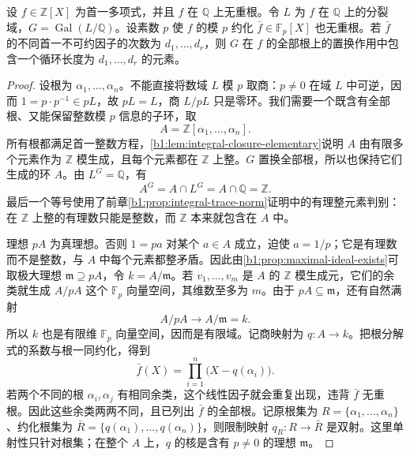 \begin{lemma}\label{b1:lem:reduction-cycle-type}
	设 \(f\in\mathbb Z[X]\) 为首一多项式，并且 \(f\) 在 \(\mathbb Q\) 上无重根。令 \(L\) 为 \(f\) 在 \(\mathbb Q\) 上的分裂域，\(G=\operatorname{Gal}(L/\mathbb Q)\)。设素数 \(p\) 使 \(f\) 的模 \(p\) 约化 \(\bar f\in\mathbb F_p[X]\) 也无重根。若 \(\bar f\) 的不同首一不可约因子的次数为 \(d_1,\ldots,d_r\)，则 \(G\) 在 \(f\) 的全部根上的置换作用中包含一个循环长度为 \(d_1,\ldots,d_r\) 的元素。
\end{lemma}
\begin{proof}
	设根为 \(\alpha_1,\ldots,\alpha_n\)。不能直接将数域 \(L\) 模 \(p\) 取商：\(p\ne0\) 在域 \(L\) 中可逆，因而 \(1=p\cdot p^{-1}\in pL\)，故 \(pL=L\)，商 \(L/pL\) 只是零环。我们需要一个既含有全部根、又能保留整数模 \(p\) 信息的子环，取
	\[
		A=\mathbb Z[\alpha_1,\ldots,\alpha_n].
	\]
	所有根都满足首一整数方程，\cref{b1:lem:integral-closure-elementary}说明 \(A\) 由有限多个元素作为 \(\mathbb Z\) 模生成，且每个元素都在 \(\mathbb Z\) 上整。\(G\) 置换全部根，所以也保持它们生成的环 \(A\)。由 \(L^G=\mathbb Q\)，有
	\[
		A^G=A\cap L^G=A\cap\mathbb Q=\mathbb Z.
	\]
	最后一个等号使用了前章\cref{b1:prop:integral-trace-norm}证明中的有理整元素判别：在 \(\mathbb Z\) 上整的有理数只能是整数，而 \(\mathbb Z\) 本来就包含在 \(A\) 中。

	理想 \(pA\) 为真理想。否则 \(1=pa\) 对某个 \(a\in A\) 成立，迫使 \(a=1/p\)；它是有理数而不是整数，与 \(A\) 中每个元素都整矛盾。因此由\cref{b1:prop:maximal-ideal-exists}可取极大理想 \(\mathfrak m\supseteq pA\)，令 \(k=A/\mathfrak m\)。若 \(v_1,\ldots,v_m\) 是 \(A\) 的 \(\mathbb Z\) 模生成元，它们的余类就生成 \(A/pA\) 这个 \(\mathbb F_p\) 向量空间，其维数至多为 \(m\)。由于 \(pA\subseteq\mathfrak m\)，还有自然满射
	\[
		A/pA\longrightarrow A/\mathfrak m=k.
	\]
	所以 \(k\) 也是有限维 \(\mathbb F_p\) 向量空间，因而是有限域。记商映射为 \(q:A\longrightarrow k\)。把根分解式的系数与根一同约化，得到
	\[
		\bar f(X)=\prod_{i=1}^n\bigl(X-q(\alpha_i)\bigr).
	\]
	若两个不同的根 \(\alpha_i,\alpha_j\) 有相同余类，这个线性因子就会重复出现，违背 \(\bar f\) 无重根。因此这些余类两两不同，且已列出 \(\bar f\) 的全部根。记原根集为 \(R=\{\alpha_1,\ldots,\alpha_n\}\)、约化根集为 \(\bar R=\{q(\alpha_1),\ldots,q(\alpha_n)\}\)，则限制映射 \(q_R:R\longrightarrow\bar R\) 是双射。这里单射性只针对根集；在整个 \(A\) 上，\(q\) 的核是含有 \(p\ne0\) 的理想 \(\mathfrak m\)。


\end{proof}
